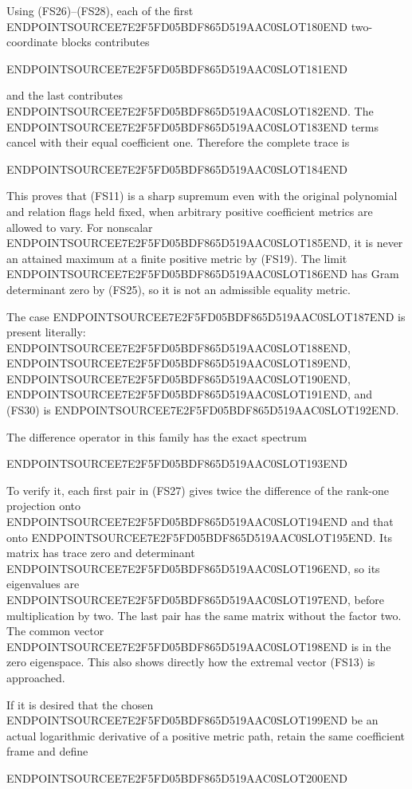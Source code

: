 Using (FS26)--(FS28), each of the first ENDPOINTSOURCEE7E2F5FD05BDF865D519AAC0SLOT180END two-coordinate blocks contributes

ENDPOINTSOURCEE7E2F5FD05BDF865D519AAC0SLOT181END

and the last contributes ENDPOINTSOURCEE7E2F5FD05BDF865D519AAC0SLOT182END. The ENDPOINTSOURCEE7E2F5FD05BDF865D519AAC0SLOT183END terms cancel with their equal coefficient one. Therefore the complete trace is

ENDPOINTSOURCEE7E2F5FD05BDF865D519AAC0SLOT184END

This proves that (FS11) is a sharp supremum even with the original polynomial and relation flags held fixed, when arbitrary positive coefficient metrics are allowed to vary. For nonscalar ENDPOINTSOURCEE7E2F5FD05BDF865D519AAC0SLOT185END, it is never an attained maximum at a finite positive metric by (FS19). The limit ENDPOINTSOURCEE7E2F5FD05BDF865D519AAC0SLOT186END has Gram determinant zero by (FS25), so it is not an admissible equality metric.

The case ENDPOINTSOURCEE7E2F5FD05BDF865D519AAC0SLOT187END is present literally: ENDPOINTSOURCEE7E2F5FD05BDF865D519AAC0SLOT188END, ENDPOINTSOURCEE7E2F5FD05BDF865D519AAC0SLOT189END, ENDPOINTSOURCEE7E2F5FD05BDF865D519AAC0SLOT190END, ENDPOINTSOURCEE7E2F5FD05BDF865D519AAC0SLOT191END, and (FS30) is ENDPOINTSOURCEE7E2F5FD05BDF865D519AAC0SLOT192END.

The difference operator in this family has the exact spectrum

ENDPOINTSOURCEE7E2F5FD05BDF865D519AAC0SLOT193END

To verify it, each first pair in (FS27) gives twice the difference of the rank-one projection onto ENDPOINTSOURCEE7E2F5FD05BDF865D519AAC0SLOT194END and that onto ENDPOINTSOURCEE7E2F5FD05BDF865D519AAC0SLOT195END. Its matrix has trace zero and determinant ENDPOINTSOURCEE7E2F5FD05BDF865D519AAC0SLOT196END, so its eigenvalues are ENDPOINTSOURCEE7E2F5FD05BDF865D519AAC0SLOT197END, before multiplication by two. The last pair has the same matrix without the factor two. The common vector ENDPOINTSOURCEE7E2F5FD05BDF865D519AAC0SLOT198END is in the zero eigenspace. This also shows directly how the extremal vector (FS13) is approached.

If it is desired that the chosen ENDPOINTSOURCEE7E2F5FD05BDF865D519AAC0SLOT199END be an actual logarithmic derivative of a positive metric path, retain the same coefficient frame and define

ENDPOINTSOURCEE7E2F5FD05BDF865D519AAC0SLOT200END

